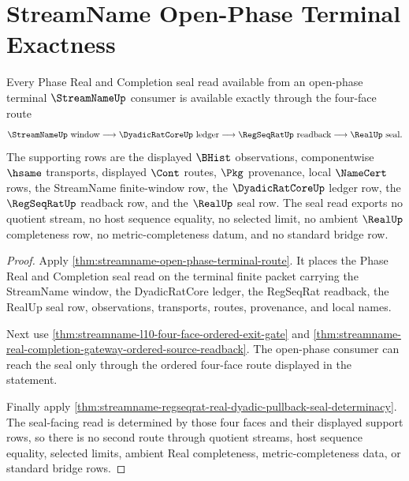 \section{StreamName Open-Phase Terminal Exactness}
\label{sec:streamname-open-phase-terminal-exactness}

\begin{theorem}
\label{thm:streamname-open-phase-terminal-seal-exactness}
Every Phase Real and Completion seal read available from an open-phase terminal $\StreamNameUp$ consumer is available exactly through the four-face route
$$
\StreamNameUp\text{ window}\longrightarrow \DyadicRatCoreUp\text{ ledger}\longrightarrow \RegSeqRatUp\text{ readback}\longrightarrow \RealUp\text{ seal}.
$$
The supporting rows are the displayed $\BHist$ observations, componentwise $\hsame$ transports, displayed $\Cont$ routes, $\Pkg$ provenance, local $\NameCert$ rows, the StreamName finite-window row, the $\DyadicRatCoreUp$ ledger row, the $\RegSeqRatUp$ readback row, and the $\RealUp$ seal row. The seal read exports no quotient stream, no host sequence equality, no selected limit, no ambient $\RealUp$ completeness row, no metric-completeness datum, and no standard bridge row.
\end{theorem}
\begin{proof}
Apply \autoref{thm:streamname-open-phase-terminal-route}. It places the Phase Real and Completion seal read on the terminal finite packet carrying the StreamName window, the DyadicRatCore ledger, the RegSeqRat readback, the RealUp seal row, observations, transports, routes, provenance, and local names.

Next use \autoref{thm:streamname-l10-four-face-ordered-exit-gate} and \autoref{thm:streamname-real-completion-gateway-ordered-source-readback}. The open-phase consumer can reach the seal only through the ordered four-face route displayed in the statement.

Finally apply \autoref{thm:streamname-regseqrat-real-dyadic-pullback-seal-determinacy}. The seal-facing read is determined by those four faces and their displayed support rows, so there is no second route through quotient streams, host sequence equality, selected limits, ambient Real completeness, metric-completeness data, or standard bridge rows.
\end{proof}

